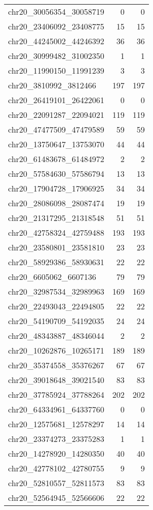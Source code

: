 \begin{longtable}{lrr}
chr20_30056354_30058719 & 0 & 0 \\
chr20_23406092_23408775 & 15 & 15 \\
chr20_44245002_44246392 & 36 & 36 \\
chr20_30999482_31002350 & 1 & 1 \\
chr20_11990150_11991239 & 3 & 3 \\
chr20_3810992_3812466 & 197 & 197 \\
chr20_26419101_26422061 & 0 & 0 \\
chr20_22091287_22094021 & 119 & 119 \\
chr20_47477509_47479589 & 59 & 59 \\
chr20_13750647_13753070 & 44 & 44 \\
chr20_61483678_61484972 & 2 & 2 \\
chr20_57584630_57586794 & 13 & 13 \\
chr20_17904728_17906925 & 34 & 34 \\
chr20_28086098_28087474 & 19 & 19 \\
chr20_21317295_21318548 & 51 & 51 \\
chr20_42758324_42759488 & 193 & 193 \\
chr20_23580801_23581810 & 23 & 23 \\
chr20_58929386_58930631 & 22 & 22 \\
chr20_6605062_6607136 & 79 & 79 \\
chr20_32987534_32989963 & 169 & 169 \\
chr20_22493043_22494805 & 22 & 22 \\
chr20_54190709_54192035 & 24 & 24 \\
chr20_48343887_48346044 & 2 & 2 \\
chr20_10262876_10265171 & 189 & 189 \\
chr20_35374558_35376267 & 67 & 67 \\
chr20_39018648_39021540 & 83 & 83 \\
chr20_37785924_37788264 & 202 & 202 \\
chr20_64334961_64337760 & 0 & 0 \\
chr20_12575681_12578297 & 14 & 14 \\
chr20_23374273_23375283 & 1 & 1 \\
chr20_14278920_14280350 & 40 & 40 \\
chr20_42778102_42780755 & 9 & 9 \\
chr20_52810557_52811573 & 83 & 83 \\
chr20_52564945_52566606 & 22 & 22 \\

\end{longtable}
